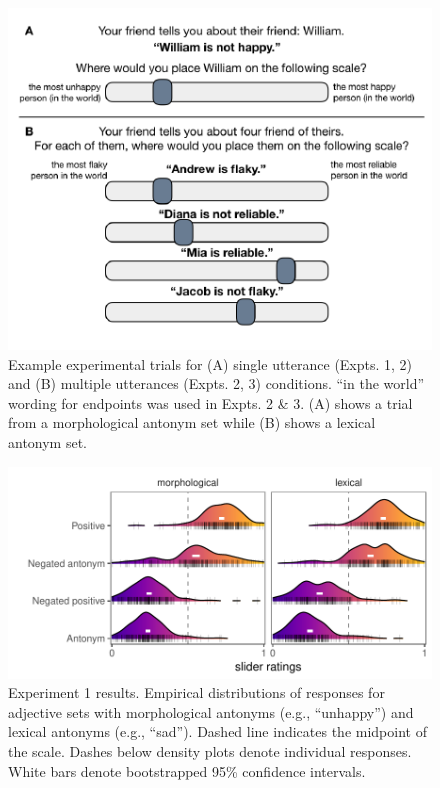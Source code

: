 \documentclass[floatsintext,doc]{apa6}
\begin{document}
\begin{figure}[hbt]

{\centering \includegraphics[width=0.7\linewidth]{figs/experiment-slides-1} 

}

\caption{Example experimental trials for (A) single utterance (Expts. 1, 2) and (B) multiple utterances (Expts. 2, 3) conditions. ``in the world'' wording for endpoints was used in Expts. 2 \& 3. (A) shows a trial from a morphological antonym set while (B) shows a lexical antonym set.}\label{fig:experiment-slides}
\end{figure}

\begin{figure}[h]
\centering \includegraphics[width=0.95\linewidth]{figs/expt1_ridges_wCIs} 
\caption{Experiment 1 results. Empirical distributions of responses for adjective sets with morphological antonyms (e.g., ``unhappy'') and lexical antonyms (e.g., ``sad''). Dashed line indicates the midpoint of the scale. Dashes below density plots denote individual responses. White bars denote bootstrapped 95\% confidence intervals.}\label{fig:expt1-results}
\end{figure}
\end{document}

